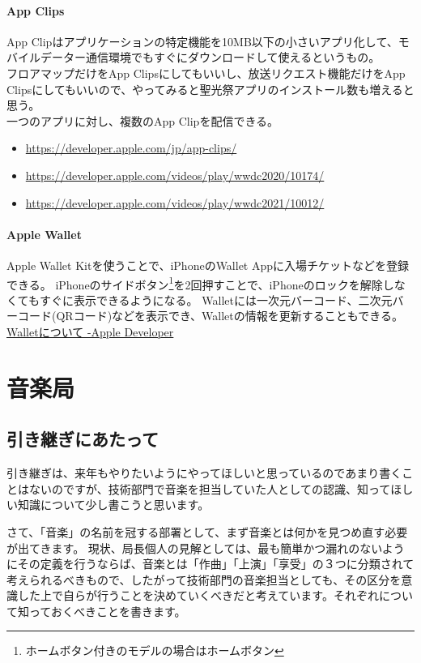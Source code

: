\documentclass[dvipdfmx,jb5]{jreport}
\newcommand{\link}[2]{\href{#2}{#1}}
\newcommand{\Chapter}[1]{\chapter{#1}\thispagestyle{fancy}}
\begin{document}
\subsubsection{App Clips}
App Clipはアプリケーションの特定機能を10MB以下の小さいアプリ化して、モバイルデーター通信環境でもすぐにダウンロードして使えるというもの。\\
フロアマップだけをApp Clipsにしてもいいし、放送リクエスト機能だけをApp Clipsにしてもいいので、やってみると聖光祭アプリのインストール数も増えると思う。\\
一つのアプリに対し、複数のApp Clipを配信できる。\\
\begin{itemize}
      \item \url{https://developer.apple.com/jp/app-clips/}
      \item \url{https://developer.apple.com/videos/play/wwdc2020/10174/}
      \item \url{https://developer.apple.com/videos/play/wwdc2021/10012/}
\end{itemize}
\subsubsection{Apple Wallet}
Apple Wallet Kitを使うことで、iPhoneのWallet Appに入場チケットなどを登録できる。
iPhoneのサイドボタン\footnote{ホームボタン付きのモデルの場合はホームボタン}を2回押すことで、iPhoneのロックを解除しなくてもすぐに表示できるようになる。
Walletには一次元バーコード、二次元バーコード(QRコード)などを表示でき、Walletの情報を更新することもできる。\\
\link{Walletについて -Apple Developer}{https://developer.apple.com/jp/wallet/}

\Chapter{音楽局}
\section{引き継ぎにあたって}
引き継ぎは、来年もやりたいようにやってほしいと思っているのであまり書くことはないのですが、技術部門で音楽を担当していた人としての認識、知ってほしい知識について少し書こうと思います。

さて、「音楽」の名前を冠する部署として、まず音楽とは何かを見つめ直す必要が出てきます。
現状、局長個人の見解としては、最も簡単かつ漏れのないようにその定義を行うならば、音楽とは「作曲」「上演」「享受」の３つに分類されて考えられるべきもので、したがって技術部門の音楽担当としても、その区分を意識した上で自らが行うことを決めていくべきだと考えています。それぞれについて知っておくべきことを書きます。
\end{document}
